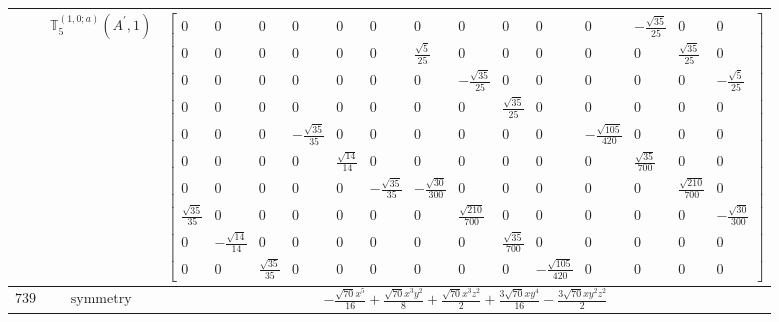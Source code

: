 \documentclass[fleqn,8pt,landscape]{jsarticle}
\begin{document}
\begin{longtable}{ccc}
$  $ & $ \mathbb{T}_{5}^{(1,0;a)}(A^{\prime},1) $ & $ \begin{bmatrix} 0 & 0 & 0 & 0 & 0 & 0 & 0 & 0 & 0 & 0 & 0 & - \frac{\sqrt{35}}{25} & 0 & 0 \\ 0 & 0 & 0 & 0 & 0 & 0 & \frac{\sqrt{5}}{25} & 0 & 0 & 0 & 0 & 0 & \frac{\sqrt{35}}{25} & 0 \\ 0 & 0 & 0 & 0 & 0 & 0 & 0 & - \frac{\sqrt{35}}{25} & 0 & 0 & 0 & 0 & 0 & - \frac{\sqrt{5}}{25} \\ 0 & 0 & 0 & 0 & 0 & 0 & 0 & 0 & \frac{\sqrt{35}}{25} & 0 & 0 & 0 & 0 & 0 \\ 0 & 0 & 0 & - \frac{\sqrt{35}}{35} & 0 & 0 & 0 & 0 & 0 & 0 & - \frac{\sqrt{105}}{420} & 0 & 0 & 0 \\ 0 & 0 & 0 & 0 & \frac{\sqrt{14}}{14} & 0 & 0 & 0 & 0 & 0 & 0 & \frac{\sqrt{35}}{700} & 0 & 0 \\ 0 & 0 & 0 & 0 & 0 & - \frac{\sqrt{35}}{35} & - \frac{\sqrt{30}}{300} & 0 & 0 & 0 & 0 & 0 & \frac{\sqrt{210}}{700} & 0 \\ \frac{\sqrt{35}}{35} & 0 & 0 & 0 & 0 & 0 & 0 & \frac{\sqrt{210}}{700} & 0 & 0 & 0 & 0 & 0 & - \frac{\sqrt{30}}{300} \\ 0 & - \frac{\sqrt{14}}{14} & 0 & 0 & 0 & 0 & 0 & 0 & \frac{\sqrt{35}}{700} & 0 & 0 & 0 & 0 & 0 \\ 0 & 0 & \frac{\sqrt{35}}{35} & 0 & 0 & 0 & 0 & 0 & 0 & - \frac{\sqrt{105}}{420} & 0 & 0 & 0 & 0 \end{bmatrix} $ \\ \hline
$ 739 $ & $ \text{symmetry} $ & $ - \frac{\sqrt{70} x^{5}}{16} + \frac{\sqrt{70} x^{3} y^{2}}{8} + \frac{\sqrt{70} x^{3} z^{2}}{2} + \frac{3 \sqrt{70} x y^{4}}{16} - \frac{3 \sqrt{70} x y^{2} z^{2}}{2} $ \\

\end{longtable}
\end{document}
